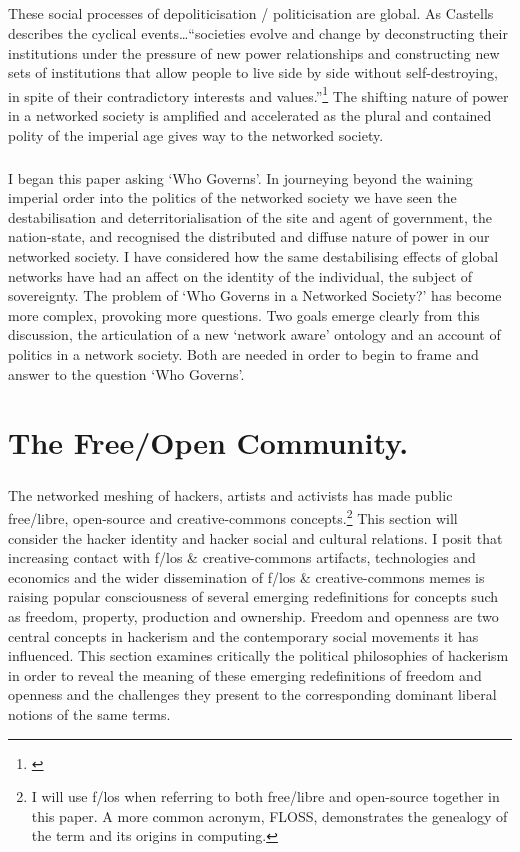 \documentclass[11pt,titlepage]{book}
\begin{document}
\paragraph{}These social processes of depoliticisation / politicisation are global. As Castells describes the cyclical events\ldots ``societies evolve and change by deconstructing their institutions under the pressure of new power relationships and constructing new sets of institutions that allow people to live side by side without self-destroying, in spite of their contradictory interests and values.''\footnote{\cite[p. 258]{castells:2007cp}} The shifting nature of power in a networked society is amplified and accelerated as the plural and contained polity of the imperial age gives way to the  networked society.

\paragraph{}I began this paper asking `Who Governs'. In journeying beyond the waining imperial order into the politics of the networked society we have seen the destabilisation and deterritorialisation of the site and agent of government, the nation-state, and recognised the distributed and diffuse nature of power in our networked society. I have considered how the same destabilising effects of global networks have had an affect on the identity of the individual, the subject of sovereignty. The problem of `Who Governs in a Networked Society?' has become more complex, provoking more questions. Two goals emerge clearly from this discussion, the articulation of a new `network aware' ontology and an account of politics in a network society. Both are needed in order to begin to frame and answer to the question `Who Governs'.
\newpage
\chapter{The Free/Open Community.}
\paragraph{}The networked meshing of hackers, artists and activists has made public free/libre, open-source and creative-commons concepts.\footnote{I will use f/los when referring to both free/libre and open-source together in this paper. A more common acronym, FLOSS, demonstrates the genealogy of the term and its origins in computing.} This section will consider the hacker identity and hacker social and cultural relations. I posit that increasing contact with f/los \& creative-commons artifacts, technologies and economics and the wider dissemination of f/los \& creative-commons memes is raising popular consciousness of several emerging redefinitions for concepts such as freedom, property, production and ownership. Freedom and openness are two central concepts in hackerism and the contemporary social movements it has influenced. This section examines critically the political philosophies of hackerism in order to reveal the meaning of these emerging redefinitions of freedom and openness and the challenges they present to the corresponding dominant liberal notions of the same terms.
\end{document}
